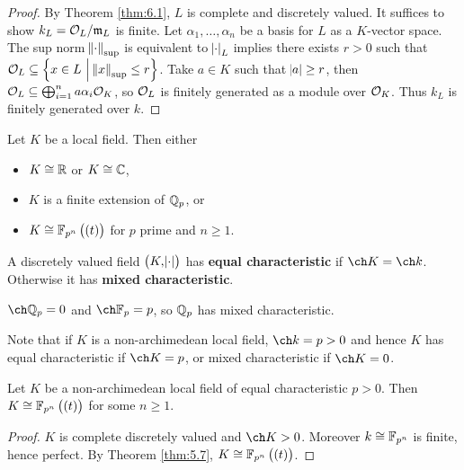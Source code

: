 \begin{proof}
By Theorem \ref{thm:6.1}, $ L $ is complete and discretely valued. It suffices to show $ k_L = \mathcal{O}_L / \mathfrak{m}_L $ is finite. Let $ \alpha_1, \dots, \alpha_n $ be a basis for $ L $ as a $ K $-vector space. The sup norm $ \norm{\cdot}_{\sup} $ is equivalent to $ \abs{\cdot}_L $ implies there exists $ r > 0 $ such that $ \OOO_L \subseteq \cbr{x \in L \st \norm{x}_{\sup} \le r} $. Take $ a \in K $ such that $ \abs{a} \ge r $, then $ \mathcal{O}_L \subseteq \bigoplus_{i = 1}^n a\alpha_i\mathcal{O}_K $, so $ \mathcal{O}_L $ is finitely generated as a module over $ \mathcal{O}_K $. Thus $ k_L $ is finitely generated over $ k $.
\end{proof}

\begin{theorem}
\label{thm:8.2}
Let $ K $ be a local field. Then either
\begin{itemize}
\item $ K \cong \mathbb{R} $ or $ K \cong \mathbb{C} $,
\item $ K $ is a finite extension of $ \mathbb{Q}_p $, or
\item $ K \cong \FF_{p^n}\br{\br{t}} $ for $ p $ prime and $ n \ge 1 $.
\end{itemize}
\end{theorem}

\begin{definition}
A discretely valued field $ \br{K, \abs{\cdot}} $ has \textbf{equal characteristic} if $ \ch K = \ch k $. Otherwise it has \textbf{mixed characteristic}.
\end{definition}

\begin{example*}
$ \ch \QQ_p = 0 $ and $ \ch \FF_p = p $, so $ \mathbb{Q}_p $ has mixed characteristic.
\end{example*}

Note that if $ K $ is a non-archimedean local field, $ \ch k = p > 0 $ and hence $ K $ has equal characteristic if $ \ch K = p $, or mixed characteristic if $ \ch K = 0 $.

\begin{theorem}
\label{thm:8.4}
Let $ K $ be a non-archimedean local field of equal characteristic $ p > 0 $. Then $ K \cong \FF_{p^n}\br{\br{t}} $ for some $ n \ge 1 $.
\end{theorem}

\begin{proof}
$ K $ is complete discretely valued and $ \ch K > 0 $. Moreover $ k \cong \mathbb{F}_{p^n} $ is finite, hence perfect. By Theorem \ref{thm:5.7}, $ K \cong \FF_{p^n}\br{\br{t}} $.
\end{proof}

